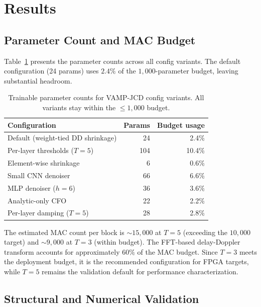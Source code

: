 \documentclass{article}
\begin{document}
\section{Results}
\label{sec:results}

\subsection{Parameter Count and MAC Budget}

Table~\ref{tab:params} presents the parameter counts across all config variants. The default configuration (24 params) uses $2.4\%$ of the $1{,}000$-parameter budget, leaving substantial headroom.

\begin{table}[h]
  \centering
  \caption{Trainable parameter counts for VAMP-JCD config variants. All variants stay within the $\leq 1{,}000$ budget.}
  \label{tab:params}
  \begin{tabular}{@{}lrr@{}}
    \toprule
    Configuration & Params & Budget usage \\
    \midrule
    Default (weight-tied DD shrinkage) & 24 & 2.4\% \\
    Per-layer thresholds ($T=5$) & 104 & 10.4\% \\
    Element-wise shrinkage & 6 & 0.6\% \\
    Small CNN denoiser & 66 & 6.6\% \\
    MLP denoiser ($h=6$) & 36 & 3.6\% \\
    Analytic-only CFO & 22 & 2.2\% \\
    Per-layer damping ($T=5$) & 28 & 2.8\% \\
    \bottomrule
  \end{tabular}
\end{table}

The estimated MAC count per block is $\sim 15{,}000$ at $T=5$ (exceeding the $10{,}000$ target) and $\sim 9{,}000$ at $T=3$ (within budget). The FFT-based delay-Doppler transform accounts for approximately $60\%$ of the MAC budget. Since $T=3$ meets the deployment budget, it is the recommended configuration for FPGA targets, while $T=5$ remains the validation default for performance characterization. %

\subsection{Structural and Numerical Validation}
\end{document}
